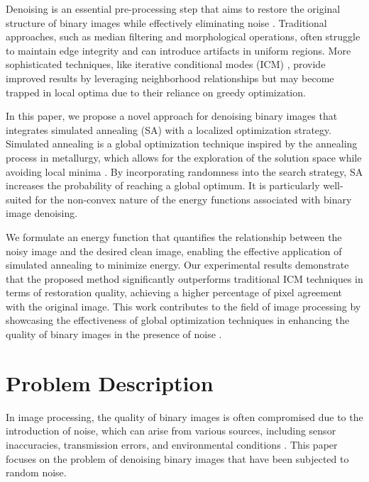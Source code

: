 \documentclass[conference]{IEEEtran}
\begin{document}
Denoising is an essential pre-processing step that aims to restore the original structure of binary images while effectively eliminating noise \cite{fan2019brief}. Traditional approaches, such as median filtering and morphological operations, often struggle to maintain edge integrity and can introduce artifacts in uniform regions. More sophisticated techniques, like iterative conditional modes (ICM) \cite{haris1996image}, provide improved results by leveraging neighborhood relationships but may become trapped in local optima due to their reliance on greedy optimization.

In this paper, we propose a novel approach for denoising binary images that integrates simulated annealing (SA) with a localized optimization strategy. Simulated annealing \cite{nikolaev2010simulated} is a global optimization technique inspired by the annealing process in metallurgy, which allows for the exploration of the solution space while avoiding local minima \cite{venkateswaran2022application}. By incorporating randomness into the search strategy, SA increases the probability of reaching a global optimum. It is particularly well-suited for the non-convex nature of the energy functions associated with binary image denoising.

We formulate an energy function that quantifies the relationship between the noisy image and the desired clean image, enabling the effective application of simulated annealing to minimize energy. Our experimental results demonstrate that the proposed method significantly outperforms traditional ICM techniques in terms of restoration quality, achieving a higher percentage of pixel agreement with the original image. This work contributes to the field of image processing by showcasing the effectiveness of global optimization techniques in enhancing the quality of binary images in the presence of noise \cite{omran2006particle}.
\vspace{-1em}

\section{Problem Description}
\vspace{0.8em}
In image processing, the quality of binary images is often compromised due to the introduction of noise, which can arise from various sources, including sensor inaccuracies, transmission errors, and environmental conditions \cite{huang1993image}. This paper focuses on the problem of denoising binary images that have been subjected to random noise.
\end{document}
